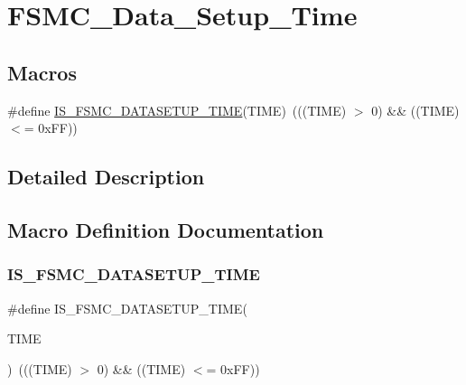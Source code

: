 \hypertarget{group___f_s_m_c___data___setup___time}{}\section{F\+S\+M\+C\+\_\+\+Data\+\_\+\+Setup\+\_\+\+Time}
\label{group___f_s_m_c___data___setup___time}
\subsection*{Macros}
\begin{DoxyCompactItemize}
\item 
\#define \mbox{\hyperlink{group___f_s_m_c___data___setup___time_ga3d923de775489e844913b29e77e8cca7}{I\+S\+\_\+\+F\+S\+M\+C\+\_\+\+D\+A\+T\+A\+S\+E\+T\+U\+P\+\_\+\+T\+I\+ME}}(T\+I\+ME)~(((T\+I\+ME) $>$ 0) \&\& ((T\+I\+ME) $<$= 0x\+F\+F))
\end{DoxyCompactItemize}


\subsection{Detailed Description}


\subsection{Macro Definition Documentation}
\mbox{\label{group___f_s_m_c___data___setup___time_ga3d923de775489e844913b29e77e8cca7}} 
\subsubsection{\texorpdfstring{IS\_FSMC\_DATASETUP\_TIME}{IS\_FSMC\_DATASETUP\_TIME}}
{\footnotesize\ttfamily \#define I\+S\+\_\+\+F\+S\+M\+C\+\_\+\+D\+A\+T\+A\+S\+E\+T\+U\+P\+\_\+\+T\+I\+ME(\begin{DoxyParamCaption}\item[{}]{T\+I\+ME }\end{DoxyParamCaption})~(((T\+I\+ME) $>$ 0) \&\& ((T\+I\+ME) $<$= 0x\+F\+F))}

